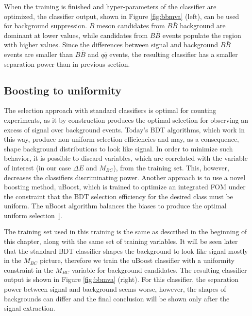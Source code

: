 \documentclass[oneside,a4paper,openany,12pt]{scrbook}
\begin{document}
When the training is finished and hyper-parameters of the classifier are optimized, the classifier output, shown in Figure \ref{fig:bbmva} (left), can be used for background suppression. $B$ meson candidates from $B \bar B$ background are dominant at lower values, while candidates from $B \bar B$ events populate the region with higher values. Since the differences between signal and background $B \bar B$ events are smaller than $B \bar B$ and $q \bar q$ events, the resulting classifier has a smaller separation power than in previous section.

\subsection{Boosting to uniformity}
The selection approach with standard classifiers is optimal for counting experiments, as it by construction produces the optimal selection for observing an excess of signal over background events. Today's BDT algorithms, which work in this way, produce non-uniform selection efficiencies and may, as a consequence, shape background distributions to look like signal. In order to minimize such behavior, it is possible to discard variables, which are correlated with the variable of interest (in our case $\Delta E$ and $M_{BC}$), from the training set. This, however, decreases the classifiers discriminating power. Another approach is to use a novel boosting method, uBoost, which is trained to optimize an integrated FOM under the constraint that the BDT selection efficiency for the desired class must be uniform. The uBoost algorithm balances the biases to produce the optimal uniform selection [].

The training set used in this training is the same as described in the beginning of this chapter, along with the same set of training variables. It will be seen later that the standard BDT classifier shapes the background to look like signal mostly in the $M_{BC}$ picture, therefore we train the uBoost classifier with a uniformity constraint in the $M_{BC}$ variable for background candidates. The resulting classifier output is shown in Figure \ref{fig:bbmva} (right). For this classifier, the separation power between signal and background seems worse, however, the shapes of backgrounds can differ and the final conclusion will be shown only after the signal extraction.
\end{document}
